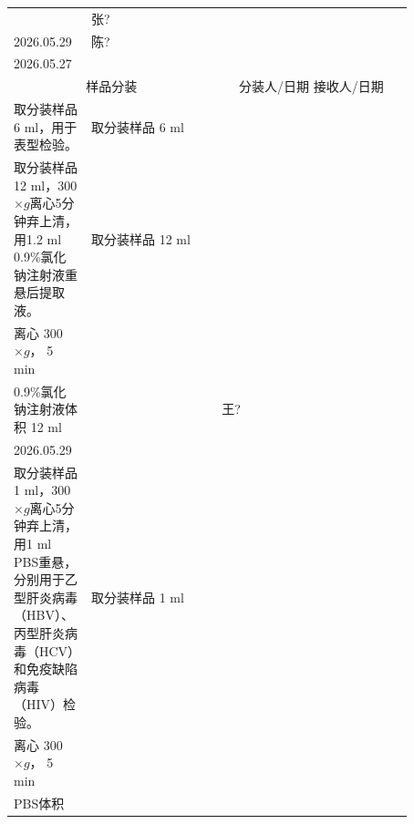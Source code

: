 \documentclass[UTF8,10pt,a4paper,fontset=fandol]{ctexart}
\newcommand{\fieldvalue}[1]{#1}
\newcommand{\handwritten}[1]{#1}
\begin{document}
\begin{tabular}{|p{0.13\linewidth}|p{0.30\linewidth}|p{0.13\linewidth}|p{0.31\linewidth}|}
&
\fieldvalue{\handwritten{张?}}\\
\fieldvalue{\handwritten{2026.05.29}}
&
\fieldvalue{\handwritten{陈?}}\\
\fieldvalue{\handwritten{2026.05.27}}
\\ \hline
\multicolumn{2}{|c|}{样品分装} &
\multicolumn{2}{c|}{分装人/日期 \quad 接收人/日期}
\\ \hline
取分装样品6 ml，用于表型检验。 &
取分装样品%
\fieldvalue{\handwritten{6}} ml
&
&
\\ \hline
取分装样品12 ml，300$\times g$离心5分钟弃上清，用1.2 ml 0.9\%氯化钠注射液重悬后提取液。 &
取分装样品%
\fieldvalue{\handwritten{12}} ml\\
离心%
\fieldvalue{\handwritten{300}} $\times g$，%
\fieldvalue{\handwritten{5}} min\\
0.9\%氯化钠注射液体积%
\fieldvalue{\handwritten{12}} ml
&
&
\fieldvalue{\handwritten{王?}}\\
\fieldvalue{\handwritten{2026.05.29}}
\\ \hline
取分装样品1 ml，300$\times g$离心5分钟弃上清，用1 ml PBS重悬，分别用于乙型肝炎病毒（HBV）、丙型肝炎病毒（HCV）和免疫缺陷病毒（HIV）检验。 &
取分装样品%
\fieldvalue{\handwritten{1}} ml\\
离心%
\fieldvalue{\handwritten{300}} $\times g$，%
\fieldvalue{\handwritten{5}} min\\
PBS体积%

\end{tabular}
\end{document}
